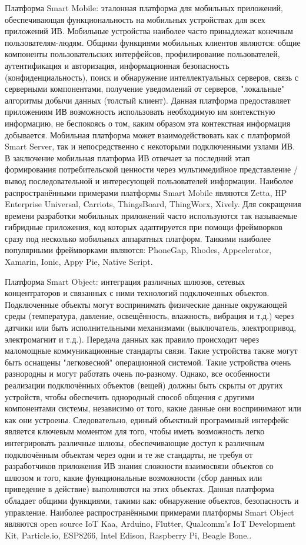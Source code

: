 \begin{textitemize}
    \item Платформа Smart Mobile: эталонная платформа для мобильных приложений, обеспечивающая функциональность на мобильных устройствах для всех приложений ИВ. Мобильные устройства наиболее часто принадлежат конечным пользователям-людям. Общими функциями мобильных клиентов являются: общие компоненты пользовательских интерфейсов, профилирование пользователей, аутентификация и авторизация, информационная безопасность (конфиденциальность), поиск и обнаружение интеллектуальных серверов, связь с серверными компонентами, получение уведомлений от серверов, "локальные" алгоритмы добычи данных (толстый клиент). Данная платформа предоставляет приложениям ИВ возможность использовать необходимую им контекстную информацию, не беспокоясь о том, каким образом эта контекстная информация добывается. Мобильная платформа может взаимодействовать как с платформой Smart Server, так и непосредственно с некоторыми подключенными узлами ИВ. В заключение мобильная платформа ИВ отвечает за последний этап формирования потребительской ценности через мультимедийное представление / вывод последовательной и интересующей пользователей информации. Наиболее распространёнными примерами платформы Smart Mobile являются Zetta, HP Enterprise Universal, Carriots, ThingsBoard, ThingWorx, Xively. Для сокращения времени разработки мобильных приложений часто используются так называемые гибридные приложения, код которых адаптируется при помощи фреймворков сразу под несколько мобильных аппаратных платформ. Таикими наиболее популярными фреймворками являются: PhoneGap, Rhodes, Appcelerator, Xamarin, Ionic, Appy Pie, Native Script.
    \item Платформа Smart Object: интеграция различных шлюзов, сетевых концентраторов и связанных с ними технологий подключенных объектов. Подключенные объекты могут воспринимать физические данные окружающей среды (температура, давление, освещённость, влажность, вибрация и т.д.) через датчики или быть исполнительными механизмами (выключатель, электропривод, электромагнит и т.д.). Передача данных как правило происходит через маломощные коммуникационные стандарты связи. Такие устройства также могут быть оснащены "легковесной" операционной системой. Такие устройства очень разнородны и могут работать очень по-разному. Однако, все особенности реализации подключённых объектов (вещей) должны быть скрыты от других устройств, чтобы обеспечить однородный способ общения с другими компонентами системы, независимо от того, какие данные они воспринимают или как они устроены. Следовательно, единый объектный программный интерфейс является ключевым моментом для того, чтобы иметь возможность легко интегрировать различные шлюзы, обеспечивающие доступ к различным подключённым объектам через одни и те же стандарты, не требуя от разработчиков приложения ИВ знания сложности взаимосвязи объектов со шлюзом и того, какие функциональные возможности (сбор данных или приведение в действие) выполняются на этих объектах. Данная платформа обладает общими функциями, такими как: обнаружение объектов, безопасность и управление. Наиболее распространёнными примерами платформы Smart Object являются open source IoT Kaa, Arduino, Flutter, Qualcomm’s IoT Development Kit, Particle.io, ESP8266, Intel Edison, Raspberry Pi, Beagle Bone..

\end{textitemize}
